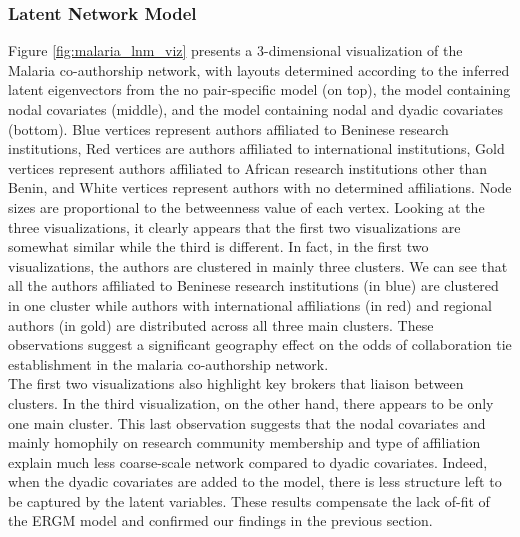\subsubsection{Latent Network Model}
\label{malaria_sec:results_lnm}
Figure \ref{fig:malaria_lnm_viz} presents a 3-dimensional visualization of the Malaria co-authorship network, with layouts determined according to the inferred latent eigenvectors from the no pair-specific model (on top), the model containing nodal covariates (middle), and the model containing nodal and dyadic covariates (bottom). Blue vertices represent authors affiliated to Beninese research institutions, Red vertices are authors affiliated to international institutions, Gold vertices represent authors affiliated to African research institutions other than Benin, and White vertices represent authors with no determined affiliations. Node sizes are proportional to the betweenness value of each vertex. Looking at the three visualizations, it clearly appears that the first two visualizations are somewhat similar while the third is different. In fact, in the first two visualizations, the authors are clustered in mainly three clusters. We can see that all the authors affiliated to Beninese research institutions (in blue) are clustered in one cluster while authors with international affiliations (in red) and regional authors (in gold) are distributed across all three main clusters. These observations suggest a significant geography effect on the odds of collaboration tie establishment in the malaria co-authorship network. \\The first two visualizations also highlight key brokers that liaison between clusters. 
In the third visualization, on the other hand, there appears to be only one main cluster. This last observation suggests that the nodal covariates and mainly homophily on research community membership and type of affiliation explain much less coarse-scale network compared to dyadic covariates. Indeed, when the dyadic covariates are added to the model, there is less structure left to be captured by the latent variables. These results compensate the lack of-fit of the ERGM model and confirmed our findings in the previous section.

